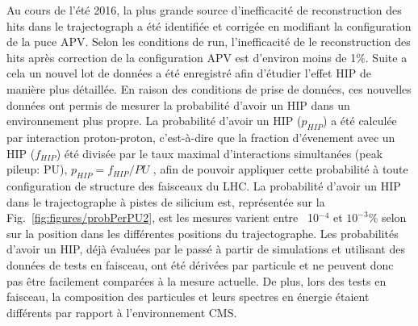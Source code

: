 
Au cours de l'été 2016, la plus grande source d'inefficacité de reconstruction des hits dans le trajectograph a été identifiée et corrigée en modifiant la configuration de la puce APV. Selon les conditions de run, l'inefficacité de le reconstruction des hits après correction de la configuration APV est d'environ moins de 1\%. Suite a cela un nouvel lot de données a été enregistré afin d'étudier l'effet HIP de manière plus détaillée. En raison des conditions de prise de données, ces nouvelles données ont permis de mesurer la probabilité d'avoir un HIP dans un environnement plus propre. La probabilité d'avoir un HIP ($p_{HIP}$) a été calculée par interaction proton-proton, c'est-à-dire que la fraction d'évenement avec un HIP ($f_{HIP}$) été divisée par le taux maximal d'interactions simultanées (peak pileup: PU), $p_{HIP} = f_{HIP}/PU$ , afin de pouvoir appliquer cette probabilité à toute configuration de structure des faisceaux du LHC. La probabilité d'avoir un HIP dans le trajectographe à pistes de silicium est, représentée sur la Fig.~\ref{fig:figures/probPerPU2}, est les mesures varient entre ~10$^{-4} $ et $ 10^{-3}$\% selon sur la position dans les différentes positions du trajectographe. Les probabilités d'avoir un HIP, déjà évaluées par le passé à partir de simulations et utilisant des données de tests en faisceau, ont été dérivées par particule et ne peuvent donc pas être facilement comparées à la mesure actuelle. De plus, lors des tests en faisceau, la composition des particules et leurs spectres en énergie étaient différents par rapport à l'environnement CMS.

